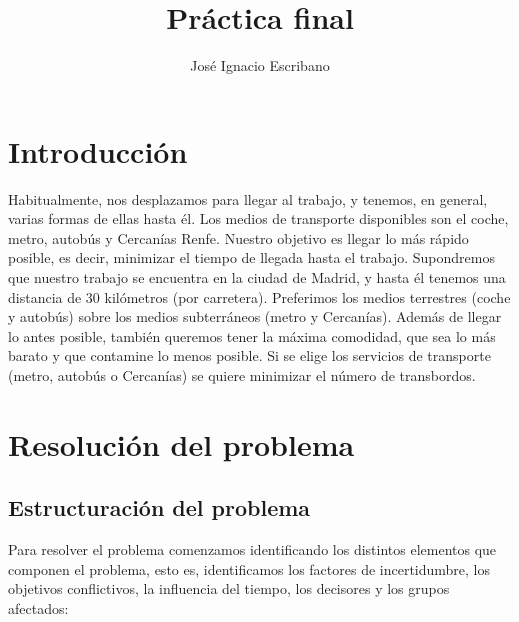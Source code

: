 \documentclass[12pt,a4paper,twoside,openright,titlepage,final]{article}
\author{José Ignacio Escribano}
\title{Práctica final}
\begin{document}
\setcounter{page}{1}


\listoffigures
\thispagestyle{empty}
\newpage

\tableofcontents
\thispagestyle{empty}
\newpage


\setcounter{page}{1}

\section{Introducción}

Habitualmente, nos desplazamos para llegar al trabajo, y tenemos, en general, varias formas de ellas hasta él. Los medios de transporte disponibles son el coche, metro, autobús y Cercanías Renfe. Nuestro objetivo es llegar lo más rápido posible, es decir, minimizar el tiempo de llegada hasta el trabajo. Supondremos que nuestro trabajo se encuentra en la ciudad de Madrid, y hasta él tenemos una distancia de 30 kilómetros (por carretera). Preferimos los medios terrestres (coche y autobús) sobre los medios subterráneos (metro y Cercanías). Además de llegar lo antes posible, también queremos tener la máxima comodidad, que sea lo más barato y que contamine lo menos posible. Si se elige los servicios de transporte (metro, autobús o Cercanías) se quiere minimizar el número de transbordos.\\

\section{Resolución del problema}

\subsection{Estructuración del problema}

Para resolver el problema comenzamos identificando los distintos elementos que componen el problema, esto es, identificamos los factores de incertidumbre, los objetivos conflictivos, la influencia del tiempo, los decisores y los grupos afectados:\\
\end{document}
